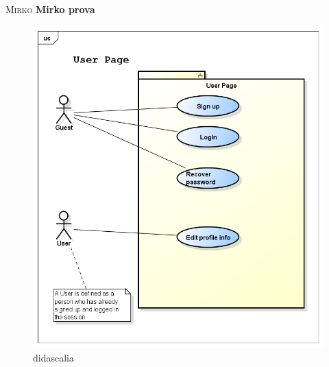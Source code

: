 \documentclass [b5paper,12pt,openany]{book}
\begin{document}
\pagestyle{empty}
\noindent
\begin{minipage}[c][\textheight][c]{\textwidth}\centering
\textsc{\Large Mirko}
\vfill
\textbf{\Huge Mirko prova}
\vfill
\Large{}
\end{minipage}



\begin{figure} 

\includegraphics[width=\textwidth]{../usecases/png/userpage} 
\caption{didascalia} 
\label{fig:userpage} 
\end{figure} 

\newpage

\newpage

\newpage

\end{document}
